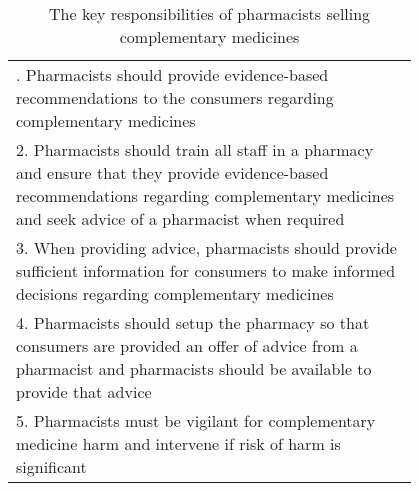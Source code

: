 \begin{table}
\centering
\begin{tabular}{p{0.8\linewidth}}
\hline\T
1. Pharmacists should provide evidence-based recommendations to the consumers regarding complementary medicines\\[6pt]
2. Pharmacists should train all staff in a pharmacy and ensure that they provide evidence-based recommendations regarding complementary medicines and seek advice of a pharmacist when required\\[6pt]
3. When providing advice, pharmacists should provide sufficient information for consumers to make informed decisions regarding complementary medicines\\[6pt]
4. Pharmacists should setup the pharmacy so that consumers are provided an offer of advice from a pharmacist and pharmacists should be available to provide that advice\\[6pt]
5. Pharmacists must be vigilant for complementary medicine harm and intervene if risk of harm is significant\B\\
\hline
\end{tabular}
\caption{The key responsibilities of pharmacists selling complementary medicines}
\label{responsibilities}
\end{table}
